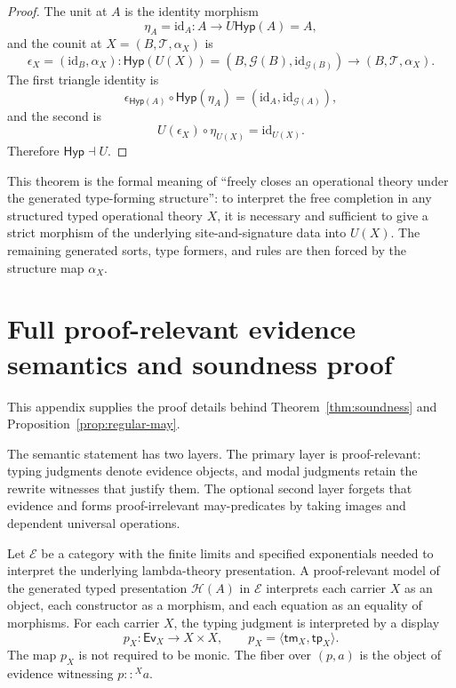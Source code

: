\documentclass[11pt]{article}
\newcommand{\ty}{\mathrel{::}}
\newcommand{\Hyp}{\mathsf{Hyp}}
\newcommand{\Ev}{\mathsf{Ev}}
\newcommand{\tm}{\mathsf{tm}}
\newcommand{\tp}{\mathsf{tp}}
\begin{document}
\begin{proof}
The unit at \(A\) is the identity morphism
\[
  \eta_A=\mathrm{id}_A:A\longrightarrow U\Hyp(A)=A,
\]
and the counit at \(X=(B,\mathcal{T},\alpha_X)\) is
\[
  \epsilon_X=(\mathrm{id}_B,\alpha_X):
  \Hyp(U(X))=(B,\mathcal{G}(B),\mathrm{id}_{\mathcal{G}(B)})
  \longrightarrow
  (B,\mathcal{T},\alpha_X).
\]
The first triangle identity is
\[
  \epsilon_{\Hyp(A)}\circ\Hyp(\eta_A)
  =
  (\mathrm{id}_A,\mathrm{id}_{\mathcal{G}(A)}),
\]
and the second is
\[
  U(\epsilon_X)\circ\eta_{U(X)}
  =
  \mathrm{id}_{U(X)}.
\]
Therefore \(\Hyp\dashv U\).
\end{proof}

This theorem is the formal meaning of ``freely closes an operational theory
under the generated type-forming structure'': to interpret the free completion
in any structured typed operational theory \(X\), it is necessary and sufficient
to give a strict morphism of the underlying site-and-signature data into
\(U(X)\).  The remaining generated sorts, type formers, and rules are then
forced by the structure map \(\alpha_X\).





\section{Full proof-relevant evidence semantics and soundness proof}
\label{app:soundness}
This appendix supplies the proof details behind Theorem~\ref{thm:soundness} and
Proposition~\ref{prop:regular-may}.

The semantic statement has two layers.  The primary layer is proof-relevant:
typing judgments denote evidence objects, and modal judgments retain the rewrite
witnesses that justify them.  The optional second layer forgets that evidence
and forms proof-irrelevant may-predicates by taking images and dependent
universal operations.

Let \(\mathcal E\) be a category with the finite limits and specified
exponentials needed to interpret the underlying lambda-theory presentation.  A
proof-relevant model of the generated typed presentation \(\mathcal H(A)\) in
\(\mathcal E\) interprets each carrier \(X\) as an object, each constructor as a
morphism, and each equation as an equality of morphisms.  For each carrier
\(X\), the typing judgment is interpreted by a display
\[
  p_X:\Ev_X\longrightarrow X\times X,
  \qquad
  p_X=\langle\tm_X,\tp_X\rangle .
\]
The map \(p_X\) is not required to be monic.  The fiber over \((p,a)\) is the
object of evidence witnessing \(p\ty^X a\).
\end{document}
